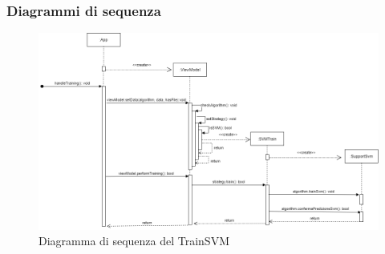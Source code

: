 \subsubsection{Diagrammi di sequenza}
\begin{figure}[H]
\centering
\includegraphics[scale=0.45]{../../Diagrams/Sequence_diagrams/trainSVM.png}
\caption{Diagramma di sequenza del TrainSVM}
\end{figure}

